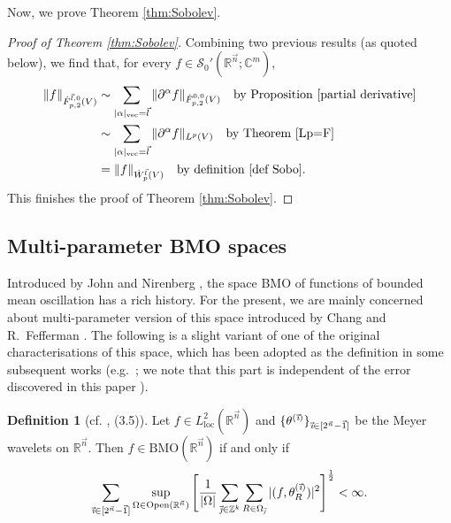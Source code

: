 \documentclass[11pt, reqno]{amsart}
\theoremstyle{definition}
\newtheorem{definition}[theorem]{Definition}
\theoremstyle{remark}
\numberwithin{equation}{section}
\newcommand{\C}{\mathbb C}
\newcommand{\R}{\mathbb R}
\newcommand{\Sc}{\mathscr S}
\newcommand{\vone}{\vec 1}
\newcommand{\vi}{\vec{\textit{\i}}}
\newcommand{\vj}{\vec{\textit{\j}}}
\newcommand{\vn}{\vec n}
\newcommand{\Open}{\mathrm{Open}}
\begin{document}
Now, we prove Theorem \ref{thm:Sobolev}.

\begin{proof}[Proof of Theorem \ref{thm:Sobolev}]
Combining two previous results (as quoted below),
we find that, for every $f\in\Sc_0'(\R^{\vn};\C^m)$,
\begin{equation*}
\begin{split}
\|f\|_{\dot F^{\vec l,0}_{p,2}(V)}
&\sim \sum_{|\alpha|_{\rm{vec}}=\vec l}\|\partial^{\alpha} f\|_{\dot F^{0,0}_{p,2}(V)}
\quad\text{by Proposition \ref{partial derivative}} \\
&\sim \sum_{|\alpha|_{\rm{vec}}=\vec l}\|\partial^{\alpha} f\|_{L^p(V)}
\quad\text{by Theorem \ref{Lp=F}} \\
&= \|f\|_{\dot W^{\vec l}_p(V)}\quad\text{by definition \eqref{def Sobo}}.
\end{split}
\end{equation*}
This finishes the proof of Theorem \ref{thm:Sobolev}.
\end{proof}

\subsection{Multi-parameter BMO spaces}\label{BMO}

Introduced by John and Nirenberg \cite{JN61}, the space BMO of functions of bounded mean oscillation has a rich history. 
For the present, we are mainly concerned about multi-parameter version of this space introduced by Chang and R.~Fefferman \cite{CF80}. The following is a slight variant of one of the original characterisations of this space, which has been adopted as the definition in some subsequent works (e.g.\ \cite[(3.5)]{LPPW}; we note that this part is independent of the error discovered in this paper \cite{LPPWe}).

\begin{definition}[cf. \cite{LPPW}, (3.5)]
Let $f\in L^2_{\mathrm{loc}}(\mathbb R^{\vn})$
and $\{\theta^{(\vi)}\}_{\vi\in[2^{\vec n}-\vec 1]}$ be the Meyer wavelets on $\mathbb R^{\vec n}$.
Then $f\in\mathrm{BMO}(\R^{\vn})$ if and only if
\begin{equation}\label{wave bmo}
  \sum_{\vi\in[2^{\vn}-\vone]}\sup_{\Omega\in\Open(\R^{\vn})} \Bigg[ \frac{1}{|\Omega|}
  \sum_{\vj\in\mathbb Z^k} \sum_{R\in \Omega_{\vj}}
|(f,\theta_R^{(\vi)})|^2 \Bigg]^{\frac12} <\infty.
\end{equation}
\end{definition}
\end{document}
